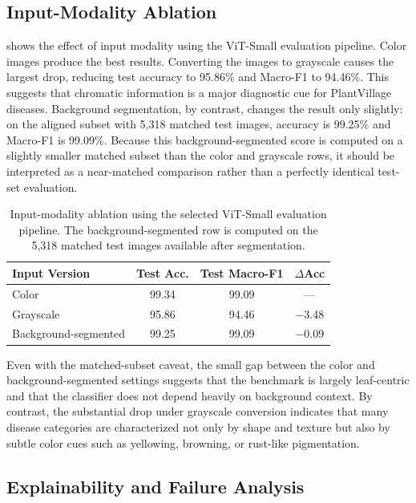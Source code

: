 \documentclass[10pt,twocolumn,letterpaper]{article}
\begin{document}
\subsection{Input-Modality Ablation}

 shows the effect of input modality using the ViT-Small evaluation pipeline. Color images produce the best results. Converting the images to grayscale causes the largest drop, reducing test accuracy to 95.86\% and Macro-F1 to 94.46\%. This suggests that chromatic information is a major diagnostic cue for PlantVillage diseases. Background segmentation, by contrast, changes the result only slightly: on the aligned subset with 5,318 matched test images, accuracy is 99.25\% and Macro-F1 is 99.09\%. Because this background-segmented score is computed on a slightly smaller matched subset than the color and grayscale rows, it should be interpreted as a near-matched comparison rather than a perfectly identical test-set evaluation.

\begin{table}[t]
\centering
\small
\begin{tabular}{lccc}
\toprule
Input Version & Test Acc. & Test Macro-F1 & $\Delta$Acc \\
\midrule
Color & 99.34 & 99.09 & --- \\
Grayscale & 95.86 & 94.46 & $-$3.48 \\
Background-segmented & 99.25 & 99.09 & $-$0.09 \\
\bottomrule
\end{tabular}
\caption{Input-modality ablation using the selected ViT-Small evaluation pipeline. The background-segmented row is computed on the 5,318 matched test images available after segmentation.}
\label{tab:ablation}
\end{table}



Even with the matched-subset caveat, the small gap between the color and background-segmented settings suggests that the benchmark is largely leaf-centric and that the classifier does not depend heavily on background context. By contrast, the substantial drop under grayscale conversion indicates that many disease categories are characterized not only by shape and texture but also by subtle color cues such as yellowing, browning, or rust-like pigmentation.


\subsection{Explainability and Failure Analysis}
\end{document}
